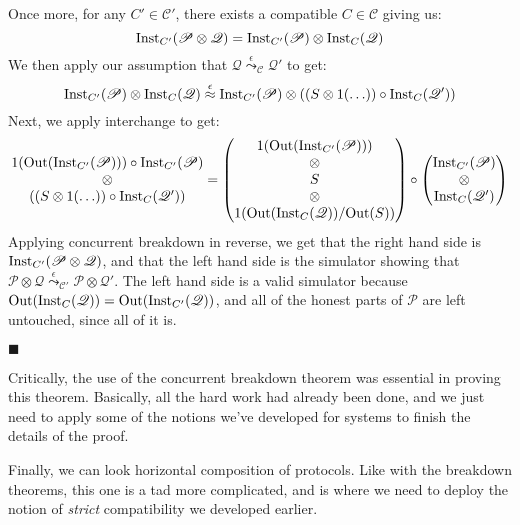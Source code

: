 \begin{theorem}
 Once more, for any $C' \in \mathscr{C}'$, there exists a compatible
$C \in \mathscr{C}$ giving us:
$$
\text{Inst}_{C'}(\mathscr{P} \otimes \mathscr{Q}) =
\text{Inst}_{C'}(\mathscr{P}) \otimes \text{Inst}_C(\mathscr{Q})
$$
We then apply our assumption that $\mathscr{Q} \overset{\epsilon}{\leadsto}_{\mathscr{C}} \mathscr{Q}'$
to get:
$$
\text{Inst}_{C'}(\mathscr{P}) \otimes \text{Inst}_C(\mathscr{Q})
\overset{\epsilon}{\approx}
\text{Inst}_{C'}(\mathscr{P}) \otimes ((S \otimes 1(\ldots)) \circ \text{Inst}_C(\mathscr{Q}'))
$$
Next, we apply interchange to get:
$$
\begin{matrix}
1(\text{Out}(\text{Inst}_{C'}(\mathscr{P}))) \circ \text{Inst}_{C'}(\mathscr{P})\cr
\otimes\cr
((S \otimes 1(\ldots)) \circ \text{Inst}_C(\mathscr{Q}'))
\end{matrix}
=
\begin{pmatrix}
1(\text{Out}(\text{Inst}_{C'}(\mathscr{P})))\cr
\otimes\cr
S\cr
\otimes\cr
1(\text{Out}(\text{Inst}_C(\mathscr{Q})) / \text{Out}(S))
\end{pmatrix}
\circ
\begin{pmatrix}
  \text{Inst}_{C'}(\mathscr{P})\cr
  \otimes\cr
  \text{Inst}_{C}(\mathscr{Q}')
\end{pmatrix}
$$
Applying concurrent breakdown in reverse, we get that the right hand
side is $\text{Inst}_{C'}(\mathscr{P} \otimes \mathscr{Q})$,
and that the left hand side is the simulator showing
that $\mathscr{P} \otimes \mathscr{Q} \overset{\epsilon}{\leadsto}_{\mathscr{C}'} \mathscr{P} \otimes \mathscr{Q}'$.
The left hand side is a valid simulator because
$\text{Out}(\text{Inst}_C(\mathscr{Q})) = \text{Out}(\text{Inst}_{C'}(\mathscr{Q}))$,
and all of the honest parts of $\mathscr{P}$ are left untouched,
since all of it is.

$\blacksquare$
\end{theorem}

Critically, the use of the concurrent breakdown theorem was
essential in proving this theorem.
Basically, all the hard work had already been done,
and we just need to apply some of the notions we've developed
for systems to finish the details of the proof.

Finally, we can look horizontal composition of protocols.
Like with the breakdown theorems, this one is a tad more complicated,
and is where we need to deploy the notion of \emph{strict}
compatibility we developed earlier.

